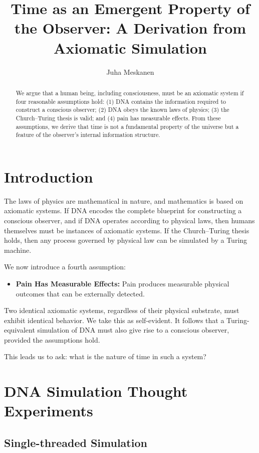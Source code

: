 \documentclass[11pt]{article}
\title{Time as an Emergent Property of the Observer: A Derivation from Axiomatic Simulation}
\author{Juha Meskanen}
\date{}
\begin{document}
\maketitle

\begin{abstract}
  We argue that a human being, including consciousness, must be an axiomatic system if four reasonable
  assumptions hold: (1) DNA contains the information required to construct a conscious observer;
  (2) DNA obeys the known laws of physics; (3) the Church--Turing thesis is valid; and (4) pain has measurable effects.
  From these assumptions, we derive that time is not a fundamental property of the universe but a feature of the
  observer's internal information structure.
\end{abstract}

\section{Introduction}

The laws of physics are mathematical in nature, and mathematics is based on axiomatic systems.
If DNA encodes the complete blueprint for constructing a conscious observer, and if DNA operates according to physical laws,
then humans themselves must be instances of axiomatic systems.
If the Church--Turing thesis holds, then any process governed by physical law can be simulated by a Turing machine.

We now introduce a fourth assumption:

\begin{itemize}
  \item \textbf{Pain Has Measurable Effects:} Pain produces measurable physical outcomes that can be externally detected.
\end{itemize}

Two identical axiomatic systems, regardless of their physical substrate, must exhibit identical behavior. We take this as self-evident. It follows that a Turing-equivalent simulation of DNA must also give rise to a conscious observer, provided the assumptions hold.

This leads us to ask: what is the nature of time in such a system?

\section{DNA Simulation Thought Experiments}

\subsection{Single-threaded Simulation}
\end{document}
